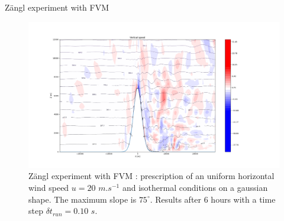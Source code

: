 \documentclass[10pt]{beamer}
\begin{document}
\begin{frame}{Zängl experiment with FVM}
    \begin{figure}
        \centering
        \includegraphics[scale=0.2]{png/zangl_isothermal.png}
        \caption{Zängl experiment with FVM : prescription of an uniform horizontal wind 
        speed $u = 20$ $m.s^{-1}$ and isothermal conditions on a gaussian shape. The maximum slope 
        is $75^{\circ}$. Results after 6 hours with a time step $\delta t_{run} = 0.10$ $s$.  }
        \label{fig:zangl}
    \end{figure}

\end{frame}
\end{document}
